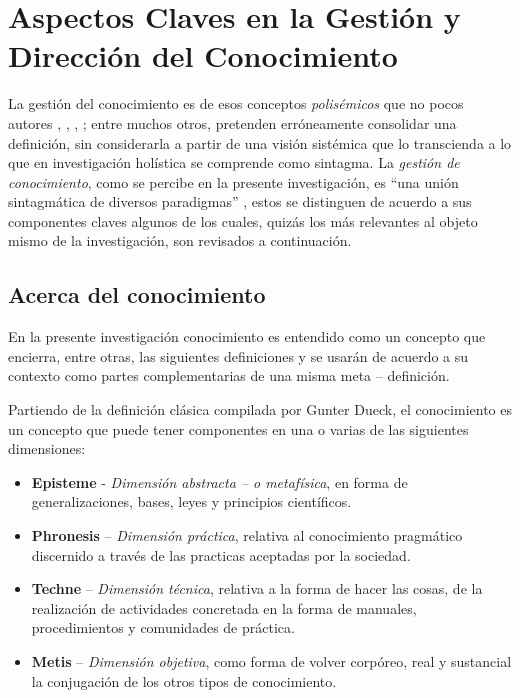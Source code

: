 \section{Aspectos Claves en la Gestión y Dirección del Conocimiento}

La gestión del conocimiento es de esos conceptos \textit{polisémicos} que no pocos autores \cite{girard2015}, \cite{firestone2001}, \cite{bergeron2003}, \cite{davenport1998}; entre muchos otros, pretenden erróneamente consolidar una definición, sin considerarla a partir de una visión sistémica que lo transcienda a lo que en investigación holística se comprende como sintagma\cite{hurtado2000}. La \textit{gestión de conocimiento}, como se percibe en la presente investigación, es “una unión sintagmática de diversos paradigmas” \cite{hurtado2000}, estos se distinguen de acuerdo a sus componentes claves  algunos de los cuales, quizás los más relevantes al objeto mismo de la investigación, son revisados a continuación.

\subsection{Acerca del conocimiento}

En la presente investigación conocimiento es entendido como un concepto que encierra, entre otras, las siguientes definiciones y se usarán de acuerdo a su contexto como partes complementarias de una misma meta – definición.

Partiendo de la definición clásica compilada por Gunter Dueck\cite{dueck2001}, el conocimiento es un concepto que puede tener componentes en una o varias de las siguientes dimensiones:

\begin{itemize}
\item  \textbf{Episteme} -\textit{ Dimensión abstracta – o metafísica}, en forma de generalizaciones, bases, leyes y principios científicos.

\item \textbf{Phronesis }– \textit{Dimensión práctica}, relativa al conocimiento pragmático discernido a través de las practicas aceptadas por la sociedad.

\item \textbf{Techne} – \textit{Dimensión técnica}, relativa a la forma de hacer las cosas, de la realización de actividades concretada en la forma de manuales, procedimientos y comunidades de práctica.

\item \textbf{Metis} – \textit{Dimensión objetiva}, como forma de volver corpóreo, real y sustancial la conjugación de los otros tipos de conocimiento.
\end{itemize}

